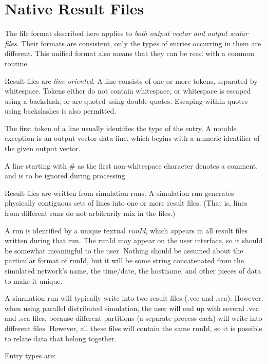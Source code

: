 \label{cha:result-file-formats}

\section{Native Result Files}
\label{cha:result-file-formats:opp}

The file format described here applies to \textit{both output vector and
output scalar files}. Their formats are consistent, only the types of
entries occurring in them are different. This unified format also
means that they can be read with a common routine.

Result files are \textit{line oriented}. A line consists of one or more
tokens, separated by whitespace. Tokens either do not
contain whitespace, or whitespace is escaped using a backslash, or
are quoted using double quotes. Escaping within quotes using
backslashes is also permitted.

The first token of a line usually identifies the type of the entry. A
notable exception is an output vector data line, which begins with a
numeric identifier of the given output vector.

A line starting with \# as the first non{}-whitespace character denotes
a comment, and is to be ignored during processing.

Result files are written from simulation runs. A simulation run
generates physically contiguous sets of lines into one or more result
files. (That is, lines from different runs do not arbitrarily mix in
the files.)

A run is identified by a unique textual \textit{runId}, which appears in
all result files written during that run. The runId may appear on the
user interface, so it should be somewhat meaningful to the user.
Nothing should be assumed about the particular format of runId, but it
will be some string concatenated from the simulated network's name, the
time/date, the hostname, and other pieces of data to make it unique.

A simulation run will typically write into two result files (.vec and
.sca). However, when using parallel distributed simulation, the user
will end up with several .vec and .sca files, because different
partitions (a separate process each) will write into different files.
However, all these files will contain the same runId, so it is possible
to relate data that belong together.

Entry types are:

